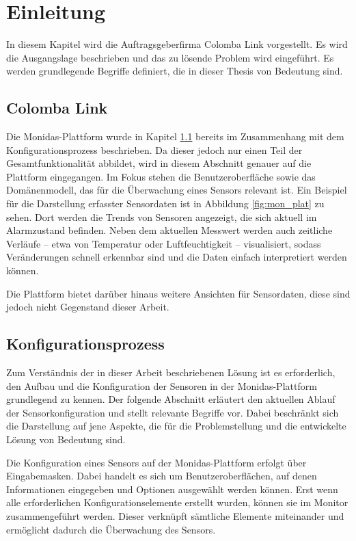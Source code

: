 \section{Einleitung}
\label{kap:ein}
In diesem Kapitel wird die Auftragsgeberfirma Colomba Link vorgestellt. Es wird die Ausgangslage beschrieben und das zu lösende Problem wird eingeführt. Es werden grundlegende Begriffe definiert, die in dieser Thesis von Bedeutung sind.

\subsection{Colomba Link}
Die Monidas-Plattform wurde in Kapitel \ref{} bereits im Zusammenhang mit dem Konfigurationsprozess beschrieben. Da dieser jedoch nur einen Teil der Gesamtfunktionalität abbildet, wird in diesem Abschnitt genauer auf die Plattform eingegangen. Im Fokus stehen die Benutzeroberfläche sowie das Domänenmodell, das für die Überwachung eines Sensors relevant ist. Ein Beispiel für die Darstellung erfasster Sensordaten ist in Abbildung \ref{fig:mon_plat} zu sehen. Dort werden die Trends von Sensoren angezeigt, die sich aktuell im Alarmzustand befinden. Neben dem aktuellen Messwert werden auch zeitliche Verläufe – etwa von Temperatur oder Luftfeuchtigkeit – visualisiert, sodass Veränderungen schnell erkennbar sind und die Daten einfach interpretiert werden können.

Die Plattform bietet darüber hinaus weitere Ansichten für Sensordaten, diese sind jedoch nicht Gegenstand dieser Arbeit.

\subsection{Konfigurationsprozess}
\label{kap:konf}

Zum Verständnis der in dieser Arbeit beschriebenen Lösung ist es erforderlich, den Aufbau und die Konfiguration der Sensoren in der Monidas-Plattform grundlegend zu kennen. Der folgende Abschnitt erläutert den aktuellen Ablauf der Sensorkonfiguration und stellt relevante Begriffe vor. Dabei beschränkt sich die Darstellung auf jene Aspekte, die für die Problemstellung und die entwickelte Lösung von Bedeutung sind.

Die Konfiguration eines Sensors auf der Monidas-Plattform erfolgt über Eingabemasken. Dabei handelt es sich um Benutzeroberflächen, auf denen Informationen eingegeben und Optionen ausgewählt werden können. Erst wenn alle erforderlichen Konfigurationselemente erstellt wurden, können sie im Monitor zusammengeführt werden. Dieser verknüpft sämtliche Elemente miteinander und ermöglicht dadurch die Überwachung des Sensors.

